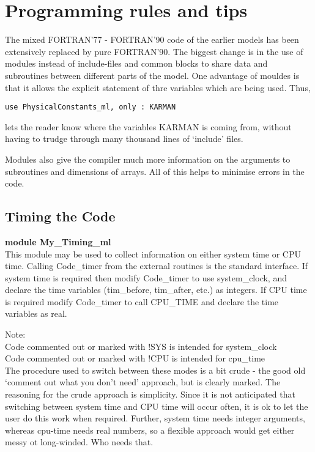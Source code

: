 \chapter{Programming rules and tips}


The mixed FORTRAN'77 - FORTRAN'90 code of the earlier models
has been extensively replaced by pure FORTRAN'90. The biggest change
is in the use of modules instead of include-files and common blocks
to share data and subroutines between different parts of the model.
One advantage of mouldes is that it allows the explicit statement
of thre variables which are being used. Thus, 

\begin{verbatim}
use PhysicalConstants_ml, only : KARMAN
\end{verbatim}

\noindent
lets the reader know where the variables KARMAN is coming from, without
having to trudge through many thousand lines of `include' files.


Modules also give the compiler much more information on the 
arguments to subroutines and dimensions of arrays. All of this
helps to minimise errors in the code.


\section{Timing the Code}

{\bf module My\_Timing\_ml}\\

  
\noindent
This module may be used to collect information on either system time or
 CPU time. Calling Code\_timer from the external routines is the standard
 interface. If system time is required then modify Code\_timer to
 use system\_clock, and declare the time variables (tim\_before, tim\_after, etc.)
 as integers. If CPU time is required modify Code\_timer to call 
 CPU\_TIME and declare the time variables as real.
\bigskip

\noindent
Note:\\
 Code commented out or marked with !SYS is intended for system\_clock\\
 Code commented out or marked with !CPU is intended for cpu\_time\\


The procedure used to switch between these modes is a bit crude - the good
old `comment out what you don't need' approach, but is clearly marked.
The reasoning for the crude approach is simplicity. Since it is not anticipated
that switching between system time and CPU time will occur often, it is
ok to let the user do this work when required. Further, system time needs
integer arguments, whereas cpu-time needs real numbers, so a flexible
approach would get either messy ot long-winded. Who needs that.


